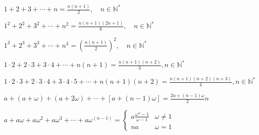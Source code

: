 \begin{myitemize}
  \item $ 1+2+3+ \cdots + n = \frac{n(n+1)}{2} ,\quad n \in \mathbb{N}^{*} $
  \item $ 1^{2}+2^{2}+3^{2}+ \cdots + n^{2} = \frac{n(n+1)(2n+1)}{6} ,\quad n \in \mathbb{N}^{*} $
  \item $ 1^{3}+2^{3}+3^{3}+ \cdots + n^{3} = \left(\frac{n(n+1)}{2}\right)^{2} ,\quad n \in \mathbb{N}^{*} $
  \item $ 1\cdot 2 + 2\cdot 3 + 3 \cdot 4 + \cdots + n(n+1) = \frac{n(n+1)(n+2)}{3} , n
    \in \mathbb{N}^{*} $
  \item $ 1\cdot 2\cdot 3 + 2\cdot 3\cdot 4 + 3 \cdot 4\cdot 5  + \cdots + n(n+1)(n+2) =
    \frac{n(n+1)(n+2)(n+3)}{4} , n \in \mathbb{N}^{*} $
  \item $ a+(a+ \omega) + (a+ 2 \omega ) + \cdots +[a+(n-1) \omega ] = \frac{2a+(n-1)
    \omega}{2}n $
  \item $ a + a \omega + a \omega ^{2} + a \omega ^{3} + \cdots + a \omega ^{(n-1)} = 
    \begin{cases}
      a \frac{\omega ^{n}-1}{\omega -1} & \omega \neq 1 \\
      na & \omega =1
    \end{cases}$
\end{myitemize}




  
